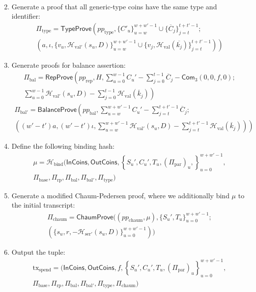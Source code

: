 \documentclass{article}
\newcommand{\func}[1]{\mathsf{#1}}
\newcommand{\com}{\func{Com}}
\newcommand{\hash}{\mathcal{H}}
\begin{document}
\begin{enumerate}
\begin{multline*}
    \end{multline*}
    \item Generate a proof that all generic-type coins have the same type and identifier:
    \begin{multline*}
        \Pi_{\text{type}} = \func{TypeProve}\left( pp_{\text{type}}, \{C'_u\}_{u=w}^{w+w'-1} \cup \{\overline{C}_j\}_{j=t}^{t+t'-1} ; \right. \\
        \left. \left( a, \iota, \{v_u, \hash_{\text{val}'}(s_u, D)\}_{u=w}^{w+w'-1} \cup \{v_j, \hash_{\text{val}}(\overline{k_j})\}_{j=t}^{t+t'-1} \right) \right)
    \end{multline*}
    \item Generate proofs for balance assertion:
    \begin{multline*}
    \Pi_{\text{bal}} = \func{RepProve}\left( pp_{\text{rep}}, H, \sum_{u=0}^{w-1} C_u' - \sum_{j=0}^{t-1} \overline{C}_j - \com_3(0,0,f,0); \right. \\
    \left. \sum_{u=0}^{w-1} \hash_{\text{val}'}(s_u,D) - \sum_{j=0}^{t-1} \hash_{\text{val}}(\overline{k}_j) \right)
    \end{multline*}
    \begin{multline*}
    \Pi_{\text{bal}'} = \func{BalanceProve}\left( pp_{\text{bal}}, \sum_{u=w}^{w+w'-1} C_u' - \sum_{j=t}^{t+t'-1} \overline{C}_j ; \right. \\
    \left. \left( (w' - t')a, (w' - t')\iota, \sum_{u=w}^{w+w'-1} \hash_{\text{val}'}(s_u,D) - \sum_{j=t}^{t+t'-1} \hash_{\text{val}}(\overline{k}_j) \right) \right)
    \end{multline*}
    \item Define the following binding hash:
    \begin{multline*}
        \mu = \hash_{\text{bind}}( \func{InCoins}, \func{OutCoins}, \left\{ S_u', C_u', T_u, (\Pi_{\text{par}})_u, \right\}_{u=0}^{w+w'-1}, \\
        \Pi_{\text{base}}, \Pi_{\text{rp}}, \Pi_{\text{bal}}, \Pi_{\text{bal}'}, \Pi_{\text{type}} )
    \end{multline*}
    \item Generate a modified Chaum-Pedersen proof, where we additionally bind $\mu$ to the initial transcript:
    \begin{multline*}
    \Pi_{\text{chaum}} = \func{ChaumProve}((pp_{\text{chaum}}, \mu), \{S_u', T_u\}_{u=0}^{w+w'-1} ; \\
    (\{s_u, r, -\hash_{\text{ser}'}(s_u, D)\}_{u=0}^{w+w'-1}))
    \end{multline*}
    \item Output the tuple:
    \begin{multline*}
    \text{tx}_{\text{spend}} = ( \func{InCoins}, \func{OutCoins}, f, \left\{ S_u', C_u', T_u, (\Pi_{\text{par}})_u \right\}_{u=0}^{w+w'-1}, \\
    \Pi_{\text{base}}, \Pi_{\text{rp}}, \Pi_{\text{bal}}, \Pi_{\text{bal}'}, \Pi_{\text{type}}, \Pi_{\text{chaum}} )
    \end{multline*}
\end{enumerate}
\end{document}
